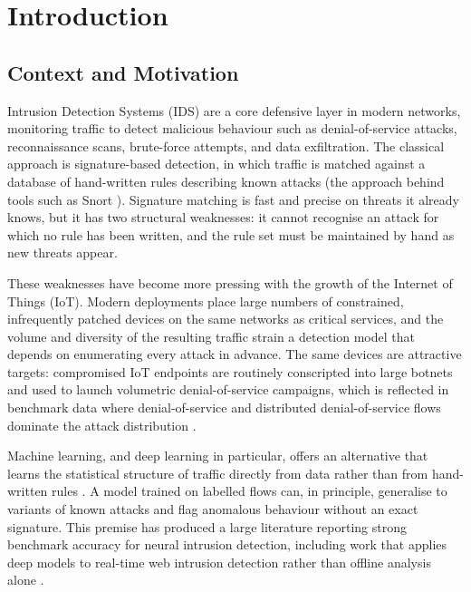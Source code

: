\chapter{Introduction}
\label{chap:introduction}

\section{Context and Motivation}
\label{sec:intro_motivation}

\par Intrusion Detection Systems (IDS) are a core defensive layer in modern networks, monitoring traffic to detect malicious behaviour such as denial-of-service attacks, reconnaissance scans, brute-force attempts, and data exfiltration. The classical approach is signature-based detection, in which traffic is matched against a database of hand-written rules describing known attacks (the approach behind tools such as Snort \cite{Roesch1999}). Signature matching is fast and precise on threats it already knows, but it has two structural weaknesses: it cannot recognise an attack for which no rule has been written, and the rule set must be maintained by hand as new threats appear.

\par These weaknesses have become more pressing with the growth of the Internet of Things (IoT). Modern deployments place large numbers of constrained, infrequently patched devices on the same networks as critical services, and the volume and diversity of the resulting traffic strain a detection model that depends on enumerating every attack in advance. The same devices are attractive targets: compromised IoT endpoints are routinely conscripted into large botnets and used to launch volumetric denial-of-service campaigns, which is reflected in benchmark data where denial-of-service and distributed denial-of-service flows dominate the attack distribution \cite{CICIoT2023}.

\par Machine learning, and deep learning in particular, offers an alternative that learns the statistical structure of traffic directly from data rather than from hand-written rules \cite{Ferrag2020, Lansky2021}. A model trained on labelled flows can, in principle, generalise to variants of known attacks and flag anomalous behaviour without an exact signature. This premise has produced a large literature reporting strong benchmark accuracy for neural intrusion detection, including work that applies deep models to real-time web intrusion detection rather than offline analysis alone \cite{AIIDS2020, Wu2022}.

